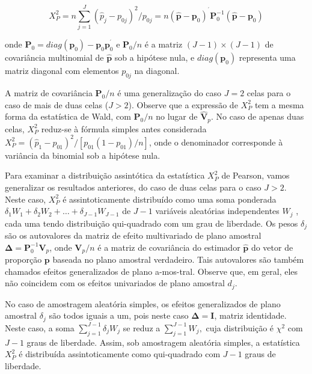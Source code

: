\documentclass[]{book}
\numberwithin{example}{chapter}
\numberwithin{remark}{chapter}
\numberwithin{definition}{chapter}
\begin{document}
\begin{equation}
X_{P}^{2}=n\sum\limits_{j=1}^{J}\left( \widehat{p}_{j}-p_{0j}\right)
^{2}/p_{0j}=n\left( \widehat{\mathbf{p}}-\mathbf{p}_{0}\right) ^{^{\prime }}
\mathbf{P}_{0}^{-1}\left( \widehat{\mathbf{p}}-\mathbf{p}_{0}\right) 
\label{eq:qual11}
\end{equation}

onde
\(\mathbf{P}_{0}=diag\left( \mathbf{p}_{0}\right) -\mathbf{p}_{0}\mathbf{p}_{0}^{^{\prime }}\)
e \(\mathbf{P}_{0}/n\) é a matriz
\(\left( J-1\right)\times \left( J-1\right)\) de covariância multinomial
de \(\widehat{\mathbf{p}}\) sob a hipótese nula, e
\(diag\left( \mathbf{p}_{0}\right)\) representa uma matriz diagonal com
elementos \(p_{0j}\) na diagonal.

A matriz de covariância \(\mathbf{P}_{0}/n\) é uma generalização do caso
\(J=2\) celas para o caso de mais de duas celas (\(J>2\)). Observe que a
expressão de \(X_{P}^{2}\) tem a mesma forma da estatística de Wald, com
\(\mathbf{P}_{0}/n\) no lugar de \(\widehat{\mathbf{V}}_{p}\). No caso
de apenas duas celas, \(X_{P}^{2}\) reduz-se à fórmula simples antes
considerada
\(X_{P}^{2}=\left( \widehat{p}_{1}-p_{01}\right) ^{2}/\left[ p_{01}\left( 1-p_{01}\right) /n\right]\),
onde o denominador corresponde à variância da binomial sob a hipótese
nula.

Para examinar a distribuição assintótica da estatística \(X_{P}^{2}\) de
Pearson, vamos generalizar os resultados anteriores, do caso de duas
celas para o caso \(J>2\). Neste caso, \(X_{P}^{2}\) é assintoticamente
distribuído como uma soma ponderada
\(\delta_{1}W_{1}+\delta _{2}W_{2}+\ldots +\delta _{J-1}W_{J-1}\) de
\(J-1\) variáveis aleatórias independentes \(W_{j}\) , cada uma tendo
distribuição qui-quadrado com um grau de liberdade. Os pesos
\(\delta _{j}\) são os autovalores da matriz de efeito multivariado de
plano amostral \(\mathbf{\Delta }=\mathbf{P}_{0}^{-1}\mathbf{V}_{p}\),
onde \(\mathbf{V}_{p}\mathbf{/}n\) é a matriz de covariância do
estimador \(\widehat{\mathbf{p}}\) do vetor de proporção \(\mathbf{p}\)
baseada no plano amostral verdadeiro. Tais autovalores são também
chamados efeitos generalizados de plano a-mos-tral. Observe que, em
geral, eles não coincidem com os efeitos univariados de plano amostral
\(d_{j}\).

No caso de amostragem aleatória simples, os efeitos generalizados de
plano amostral \(\delta _{j}\) são todos iguais a um, pois neste caso
\(\mathbf{\Delta =I}\), matriz identidade. Neste caso, a soma
\(\sum_{j=1}^{J-1}\delta _{j}W_{j}\) se reduz a
\(\sum_{j=1}^{J-1}W_{j},\) cuja distribuição é \(\chi ^{2}\) com \(J-1\)
graus de liberdade. Assim, sob amostragem aleatória simples, a
estatística \(X_{P}^{2}\) é distribuída assintoticamente como
qui-quadrado com \(J-1\) graus de liberdade.
\end{document}
